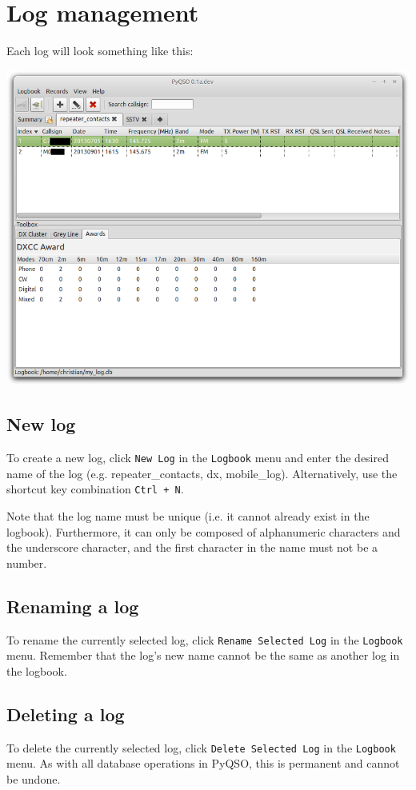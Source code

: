 \documentclass[11pt, a4paper]{report}
\begin{document}
\chapter{Log management}\label{chap:log_management}
Each log will look something like this:
\begin{center}
  \includegraphics[width=1\columnwidth]{images/log_with_awards.png}
\end{center}

\section{New log}
To create a new log, click \texttt{New Log} in the \texttt{Logbook} menu and enter the desired name of the log (e.g. repeater\_contacts, dx, mobile\_log). Alternatively, use the shortcut key combination \texttt{Ctrl + N}. 

Note that the log name must be unique (i.e. it cannot already exist in the logbook). Furthermore, it can only be composed of alphanumeric characters and the underscore character, and the first character in the name must not be a number. 

\section{Renaming a log}
To rename the currently selected log, click \texttt{Rename Selected Log} in the \texttt{Logbook} menu. Remember that the log's new name cannot be the same as another log in the logbook.

\section{Deleting a log}
To delete the currently selected log, click \texttt{Delete Selected Log} in the \texttt{Logbook} menu. As with all database operations in PyQSO, this is permanent and cannot be undone.
\end{document}
